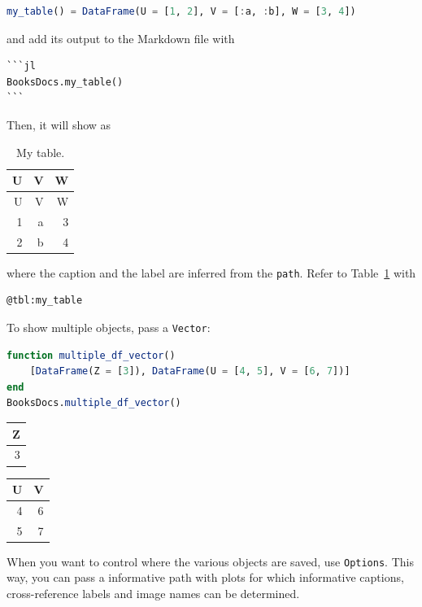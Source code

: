\documentclass[
  notoc %
]{tufte-book}
\newcommand{\passthrough}[1]{#1}
\begin{document}
\begin{lstlisting}[language=Julia]
my_table() = DataFrame(U = [1, 2], V = [:a, :b], W = [3, 4])
\end{lstlisting}

and add its output to the Markdown file with

\begin{lstlisting}
```jl
BooksDocs.my_table()
```
\end{lstlisting}

Then, it will show as

\hypertarget{tbl:my_table}{}
\begin{longtable}[]{@{}rrr@{}}
\caption{\label{tbl:my_table}My table.}\tabularnewline
\toprule()
U & V & W \\
\midrule()
\endfirsthead
\toprule()
U & V & W \\
\midrule()
\endhead
1 & a & 3 \\
2 & b & 4 \\
\bottomrule()
\end{longtable}

where the caption and the label are inferred from the
\passthrough{\lstinline!path!}. Refer to Table~\ref{tbl:my_table} with

\begin{lstlisting}
@tbl:my_table
\end{lstlisting}

To show multiple objects, pass a \passthrough{\lstinline!Vector!}:

\begin{lstlisting}[language=Julia]
function multiple_df_vector()
    [DataFrame(Z = [3]), DataFrame(U = [4, 5], V = [6, 7])]
end
BooksDocs.multiple_df_vector()
\end{lstlisting}

\begin{longtable}[]{@{}r@{}}
\toprule()
Z \\
\midrule()
\endhead
3 \\
\bottomrule()
\end{longtable}

\begin{longtable}[]{@{}rr@{}}
\toprule()
U & V \\
\midrule()
\endhead
4 & 6 \\
5 & 7 \\
\bottomrule()
\end{longtable}

When you want to control where the various objects are saved, use
\passthrough{\lstinline!Options!}. This way, you can pass a informative
path with plots for which informative captions, cross-reference labels
and image names can be determined.
\end{document}
